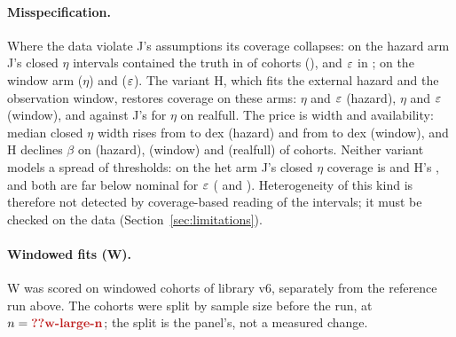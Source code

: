 \paragraph{Misspecification.} Where the data violate J's assumptions its coverage collapses: on the hazard arm J's closed
$\eta$ intervals contained the truth in  of  cohorts (), and
$\varepsilon$ in ; on the window arm  ($\eta$) and  ($\varepsilon$). The
variant H, which fits the external hazard and the observation window, restores coverage on these arms: $\eta$
 and $\varepsilon$  (hazard), $\eta$  and $\varepsilon$ 
(window), and  against J's  for $\eta$ on realfull. The price is width and
availability: median closed $\eta$ width rises from  to  dex (hazard)
and from  to  dex (window), and H declines $\beta$ on
 (hazard),  (window) and  (realfull) of cohorts.
Neither variant models a spread of thresholds: on the het arm J's closed $\eta$ coverage is  and H's
, and both are far below nominal for $\varepsilon$ ( and ).
Heterogeneity of this kind is therefore not detected by coverage-based reading of the intervals; it must be checked on
the data (Section~\ref{sec:limitations}).

\paragraph{Windowed fits (W).} W was scored on windowed cohorts of library v6, separately from the reference run above. The
cohorts were split by sample size before the run, at $n=\C{w-large-n}$; the split is the panel's, not a measured change.


